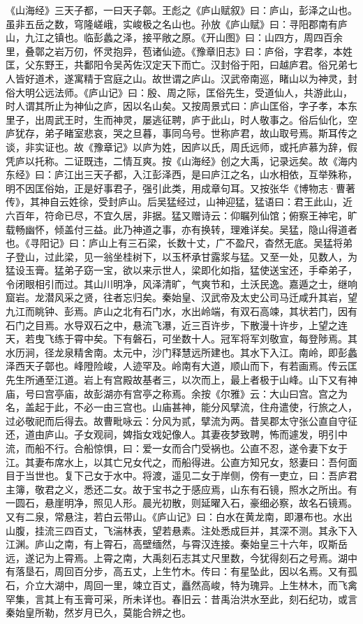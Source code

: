 \documentclass[12pt,UTF8]{ctexbook}
\begin{document}
《山海经》三天子都，一曰天子鄣。王彪之《庐山赋叙》曰：庐山，彭泽之山也。虽非五岳之数，穹隆嵯峨，实峻极之名山也。孙放《庐山赋》曰：寻阳郡南有庐山，九江之镇也。临彭蠡之泽，接平敞之原。《开山图》曰：山四方，周四百余里，叠鄣之岩万仞，怀灵抱异，苞诸仙迹。《豫章旧志》曰：庐俗，字君孝，本姓匡，父东野王，共鄱阳令吴芮佐汉定天下而亡。汉封俗于阳，曰越庐君。俗兄弟七人皆好道术，遂寓精于宫庭之山。故世谓之庐山。汉武帝南巡，睹山以为神灵，封俗大明公远法师。《庐山记》曰：殷、周之际，匡俗先生，受道仙人，共游此山，时人谓其所止为神仙之庐，因以名山矣。又按周景式曰：庐山匡俗，字子孝，本东里子，出周武王时，生而神灵，屡逃征聘，庐于此山，时人敬事之。俗后仙化，空庐犹存，弟子睹室悲哀，哭之旦暮，事同乌号。世称庐君，故山取号焉。斯耳传之谈，非实证也。故《豫章记》以庐为姓，因庐以氏，周氏远师，或托庐慕为辞，假凭庐以托称。二证既违，二情互爽。按《山海经》创之大禹，记录远矣。故《海内东经》曰：庐江出三天子都，入江彭泽西，是曰庐江之名，山水相依，互举殊称，明不因匡俗始，正是好事君子，强引此类，用成章句耳。又按张华《博物志·曹著传》，其神自云姓徐，受封庐山。后吴猛经过，山神迎猛，猛语曰：君王此山，近六百年，符命已尽，不宜久居，非据。猛又赠诗云：仰瞩列仙馆；俯察王神宅，旷载畅幽怀，倾盖付三益。此乃神道之事，亦有换转，理难详矣。吴猛，隐山得道者也。《寻阳记》曰：庐山上有三石梁，长数十丈，广不盈尺，杳然无底。吴猛将弟子登山，过此梁，见一翁坐桂树下，以玉杯承甘露浆与猛。又至一处，见数人，为猛设玉膏。猛弟子窈一宝，欲以来示世人，梁即化如指，猛使送宝还，手牵弟子，令闭眼相引而过。其山川明净，风泽清旷，气爽节和，土沃民逸。嘉遁之士，继响窟岩。龙潜风采之贤，往者忘归矣。秦始皇、汉武帝及太史公司马迁咸升其岩，望九江而眺钟、彭焉。庐山之北有石门水，水出岭端，有双石高竦，其状若门，因有石门之目焉。水导双石之中，悬流飞瀑，近三百许步，下散漫十许步，上望之连天，若曳飞练于霄中矣。下有磐石，可坐数十人。冠军将军刘敬宣，每登陟焉。其水历涧，径龙泉精舍南。太元中，沙门释慧远所建也。其水下入江。南岭，即彭蠡泽西天子鄣也。峰隥险峻，人迹罕及。岭南有大道，顺山而下，有若画焉。传云匡先生所通至江道。岩上有宫殿故基者三，以次而上，最上者极于山峰。山下又有神庙，号曰宫亭庙，故彭湖亦有宫亭之称焉。余按《尔雅》云：大山曰宫。宫之为名，盖起于此，不必一由三宫也。山庙甚神，能分风擘流，住舟遣使，行旅之人，过必敬祀而后得去。故曹毗咏云：分风为贰，擘流为两。昔吴郡太守张公直自守征还，道由庐山。子女观祠，婢指女戏妃像人。其妻夜梦致聘，怖而遽发，明引中流，而船不行。合船惊惧，曰：爱一女而合门受祸也。公直不忍，遂令妻下女于江。其妻布席水上，以其亡兄女代之，而船得进。公直方知兄女，怒妻曰：吾何面目于当世也。复下己女于水中。将渡，遥见二女于岸侧，傍有一吏立，曰：吾庐君主簿，敬君之义，悉还二女。故于宝书之于感应焉，山东有石镜，照水之所出。有一圆石，悬崖明净，照见人形。晨光初散，则延曜入石，豪细必察，故名石镜焉。又有二泉，常悬注，若白云带山。《庐山记》曰：白水在黄龙南，即瀑布也。水出山腹，挂流三四百丈，飞湍林表，望若悬素。注处悉成巨并，其深不测。其永下入江渊。庐山之南，有上霄石，高壁缅然，与霄汉连接。秦始皇三十六年，叹斯岳远，遂记为上霄焉。上霄之南，大禹刻石志其丈尺里数，今犹得刻石之号焉。湖中有落垦石，周回百分步，高五丈，上生竹木。传曰：有星坠此，因以名焉。又有孤石，介立大湖中，周回一里，竦立百丈，矗然高峻，特为瑰异。上生林木，而飞禽罕集，言其上有玉膏可采，所未详也。春旧云：昔禹治洪水至此，刻石纪功，或言秦始皇所勒，然岁月已久，莫能合辨之也。
\end{document}
